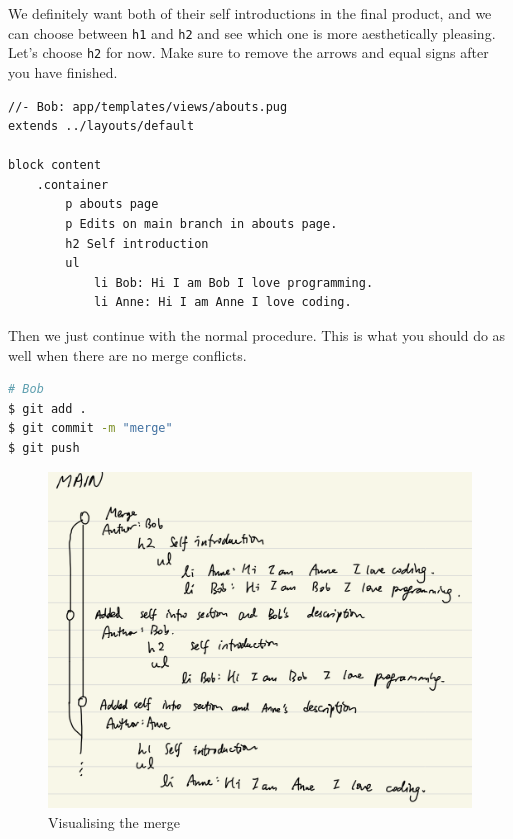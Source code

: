 We definitely want both of their self introductions in the final product, and we can choose between \texttt{h1} and \texttt{h2} and see which one is more aesthetically pleasing. Let's choose \texttt{h2} for now. Make sure to remove the arrows and equal signs after you have finished. 

\begin{lstlisting}[language=pug]
//- Bob: app/templates/views/abouts.pug
extends ../layouts/default

block content
	.container
		p abouts page
		p Edits on main branch in abouts page.
		h2 Self introduction
		ul
			li Bob: Hi I am Bob I love programming.
			li Anne: Hi I am Anne I love coding.
\end{lstlisting}

Then we just continue with the normal procedure. This is what you should do as well when there are no merge conflicts.

\begin{lstlisting}[language=bash]
# Bob
$ git add .
$ git commit -m "merge"
$ git push
\end{lstlisting}

\begin{figure}[H]
\centering
\includegraphics[width=15cm]{images/chn8-same-branch-merge.png}
\caption{Visualising the merge}
\end{figure}


